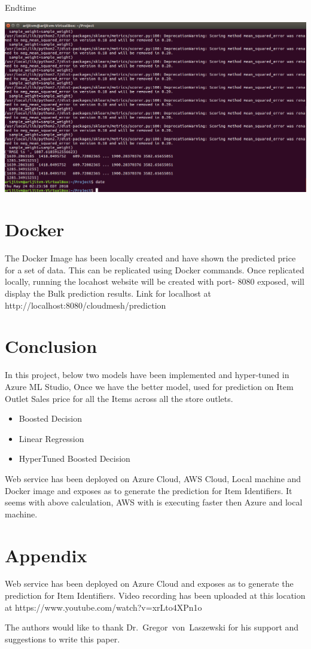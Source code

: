 Endtime 

\includegraphics[width=\columnwidth]{Images/EndTimelocal.png}


\section{Docker}

The Docker Image has been locally created and have shown the predicted 
price for a set of data. This can be replicated using Docker commands. 
Once replicated locally, running the locahost website will be created 
with port- 8080 exposed, will display the Bulk prediction results.
Link for localhost at http://localhost:8080/cloudmesh/prediction

\section{Conclusion}

In this project, below two models have been implemented and 
hyper-tuned in Azure ML Studio, Once we have the better model, used for 
prediction on Item Outlet Sales price for all the Items 
across all the store outlets.
\begin{itemize}
\item Boosted Decision
\item Linear Regression
\item HyperTuned Boosted Decision
\end{itemize}
Web service has been deployed on Azure Cloud, AWS Cloud, Local machine 
and Docker image and exposes 
as to generate the prediction for Item Identifiers. It seems with above 
calculation, AWS with is executing faster then Azure and local machine.

\section{Appendix}

Web service has been deployed on Azure Cloud and exposes as to generate 
the prediction for Item Identifiers.
Video recording has been uploaded at this location at 
https://www.youtube.com/watch?v=xrLto4XPn1o

\begin{acks}

  The authors would like to thank Dr.~Gregor~von~Laszewski for his
  support and suggestions to write this paper.

\end{acks}


 
